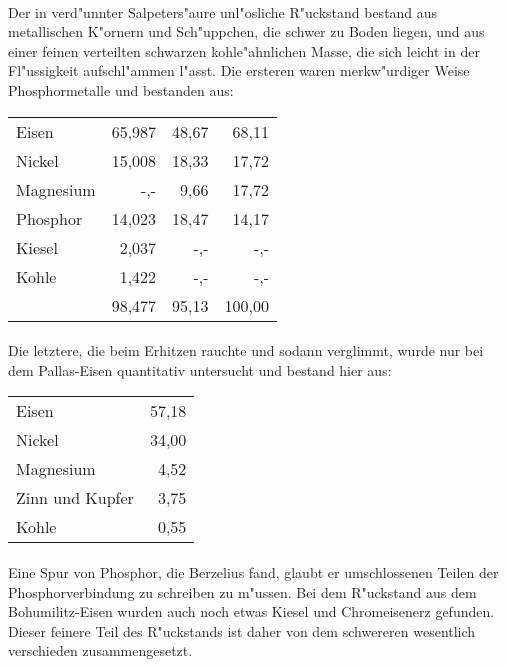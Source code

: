 \documentclass[a4paper, 11pt, oneside, german]{article}
\begin{document}
\paragraph{}
Der in verd"unnter Salpeters"aure unl"osliche R"uckstand bestand aus metallischen K"ornern und Sch"uppchen, die schwer zu Boden liegen, und aus einer feinen verteilten schwarzen kohle"ahnlichen Masse, die sich leicht in der Fl"ussigkeit aufschl"ammen l"asst. Die ersteren waren merkw"urdiger Weise Phosphormetalle und bestanden aus:
\begin{center}
\begin{tabular}{ l r r r }
    Eisen & 65,987 & 48,67 & 68,11\\
    Nickel & 15,008 & 18,33 & 17,72\\
    Magnesium & -,- & 9,66 & 17,72\\
    Phosphor & 14,023 & 18,47 & 14,17\\
    Kiesel & 2,037 & -,- & -,-\\
    Kohle & 1,422 & -,- & -,-\\
     & 98,477 & 95,13 & 100,00\\
\end{tabular}
\end{center}
\paragraph{}
Die letztere, die beim Erhitzen rauchte und sodann verglimmt, wurde nur bei dem Pallas-Eisen quantitativ untersucht und bestand hier aus:
\begin{center}
\begin{tabular}{ l r }
    Eisen & 57,18\\
    Nickel & 34,00\\
    Magnesium & 4,52\\
    Zinn und Kupfer & 3,75\\
    Kohle & 0,55\\
\end{tabular}
\end{center}
\paragraph{}
Eine Spur von Phosphor, die Berzelius fand, glaubt er umschlossenen Teilen der Phosphorverbindung zu schreiben zu m"ussen. Bei dem R"uckstand aus dem Bohumilitz-Eisen wurden auch noch etwas Kiesel und Chromeisenerz gefunden. Dieser feinere Teil des R"uckstands ist daher von dem schwereren wesentlich verschieden zusammengesetzt.
\end{document}
